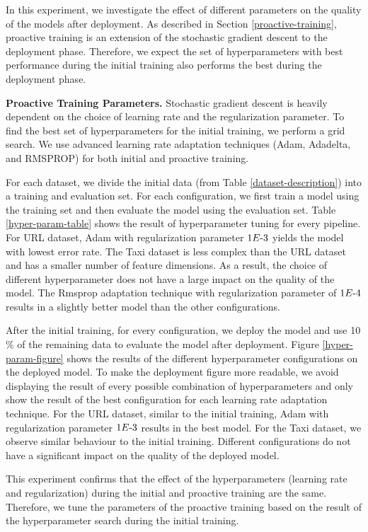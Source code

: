 In this experiment, we investigate the effect of different parameters on the quality of the models after deployment.
As described in Section \ref{proactive-training}, proactive training is an extension of the stochastic gradient descent to the deployment phase.
Therefore, we expect the set of hyperparameters with best performance during the initial training also performs the best during the deployment phase.

\textbf{Proactive Training Parameters. }
Stochastic gradient descent is heavily dependent on the choice of learning rate and the regularization parameter.
To find the best set of hyperparameters for the initial training, we perform a grid search.
We use advanced learning rate adaptation techniques (Adam, Adadelta, and RMSPROP) for both initial and proactive training.

For each dataset, we divide the initial data (from Table \ref{dataset-description}) into a training and evaluation set.
For each configuration, we first train a model using the training set and then evaluate the model using the evaluation set.
Table \ref{hyper-param-table} shows the result of hyperparameter tuning for every pipeline.
For URL dataset, Adam with regularization parameter $1E{\text -}3$ yields the model with lowest error rate.
The Taxi dataset is less complex than the URL dataset and has a smaller number of feature dimensions.
As a result, the choice of different hyperparameter does not have a large impact on the quality of the model.
The Rmsprop adaptation technique with regularization parameter of $1E{\text -}4$ results in a slightly better model than the other configurations.

After the initial training, for every configuration, we deploy the model and use 10 \% of the remaining data to evaluate the model after deployment.
Figure \ref{hyper-param-figure} shows the results of the different hyperparameter configurations on the deployed model.
To make the deployment figure more readable, we avoid displaying the result of every possible combination of hyperparameters and only show the result of the best configuration for each learning rate adaptation technique.
For the URL dataset, similar to the initial training, Adam with regularization parameter $1E{\text -}3$ results in the best model.
For the Taxi dataset, we observe similar behaviour to the initial training.
Different configurations do not have a significant impact on the quality of the deployed model.

This experiment confirms that the effect of the hyperparameters (learning rate and regularization) during the initial and proactive training are the same.
Therefore, we tune the parameters of the proactive training based on the result of the hyperparameter search during the initial training.

